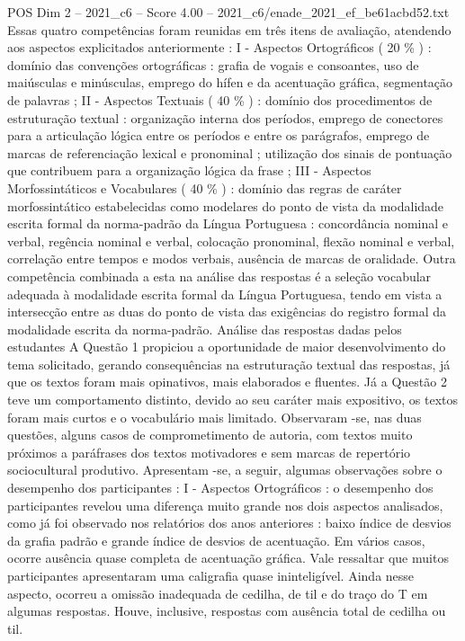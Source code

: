 \begin{textsample}{POS Dim 2 – 2021\_c6 – Score 4.00 – 2021\_c6/enade\_2021\_ef\_be61acbd52.txt}
Essas quatro competências foram reunidas em três itens de avaliação, atendendo aos aspectos explicitados anteriormente : I - Aspectos Ortográficos ( 20 \% ) : domínio das convenções ortográficas : grafia de vogais e consoantes, uso de maiúsculas e minúsculas, emprego do hífen e da acentuação gráfica, segmentação de palavras ; II - Aspectos Textuais ( 40 \% ) : domínio dos procedimentos de estruturação textual : organização interna dos períodos, emprego de conectores para a articulação lógica entre os períodos e entre os parágrafos, emprego de marcas de referenciação lexical e pronominal ; utilização dos sinais de pontuação que contribuem para a organização lógica da frase ; III - Aspectos Morfossintáticos e Vocabulares ( 40 \% ) : domínio das regras de caráter morfossintático estabelecidas como modelares do ponto de vista da modalidade escrita formal da norma-padrão da Língua Portuguesa : concordância nominal e verbal, regência nominal e verbal, colocação pronominal, flexão nominal e verbal, correlação entre tempos e modos verbais, ausência de marcas de oralidade.
Outra competência combinada a esta na análise das respostas é a seleção vocabular adequada à modalidade escrita formal da Língua Portuguesa, tendo em vista a intersecção entre as duas do ponto de vista das exigências do registro formal da modalidade escrita da norma-padrão.
Análise das respostas dadas pelos estudantes A Questão 1 propiciou a oportunidade de maior desenvolvimento do tema solicitado, gerando consequências na estruturação textual das respostas, já que os textos foram mais opinativos, mais elaborados e fluentes.
Já a Questão 2 teve um comportamento distinto, devido ao seu caráter mais expositivo, os textos foram mais curtos e o vocabulário mais limitado.
Observaram -se, nas duas questões, alguns casos de comprometimento de autoria, com textos muito próximos a paráfrases dos textos motivadores e sem marcas de repertório sociocultural produtivo.
Apresentam -se, a seguir, algumas observações sobre o desempenho dos participantes : I - Aspectos Ortográficos : o desempenho dos participantes revelou uma diferença muito grande nos dois aspectos analisados, como já foi observado nos relatórios dos anos anteriores : baixo índice de desvios da grafia padrão e grande índice de desvios de acentuação.
Em vários casos, ocorre ausência quase completa de acentuação gráfica.
Vale ressaltar que muitos participantes apresentaram uma caligrafia quase ininteligível.
Ainda nesse aspecto, ocorreu a omissão inadequada de cedilha, de til e do traço do T em algumas respostas.
Houve, inclusive, respostas com ausência total de cedilha ou til.

\end{textsample}

